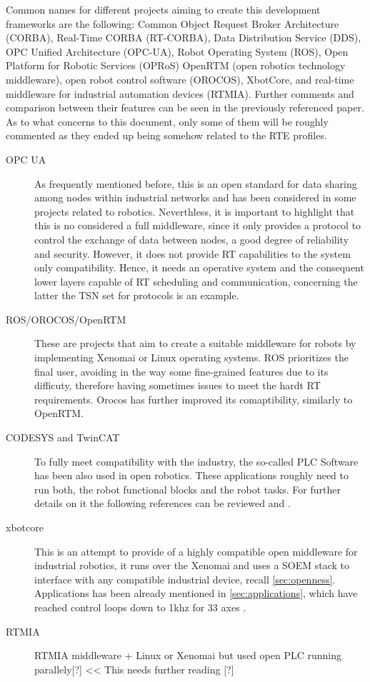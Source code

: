 Common names for different projects aiming to create this development frameworks are the following: Common Object Request Broker Architecture
(CORBA), Real-Time CORBA (RT-CORBA), Data Distribution Service (DDS), OPC Unified Architecture (OPC-UA), Robot Operating System
(ROS), Open Platform for Robotic Services (OPRoS) OpenRTM (open robotics technology middleware), open robot control software (OROCOS), 
XbotCore, and real-time middleware for industrial automation devices (RTMIA). Further comments and comparison between their features
can be seen in the previously referenced paper. As to what concerns to this document, only some of them will be roughly commented
as they ended up being somehow related to the RTE profiles\cite{middleware_xbotcore}.

\begin{description}
    \item[OPC UA] As frequently mentioned before, this is an open standard for data sharing among nodes within industrial networks and has
    been considered in some projects related to robotics. Neverthless, it is important to highlight that this is no considered a full 
    middleware, since it only provides a protocol to control the exchange of data between nodes, a good degree of reliability and security.
    However, it does not provide RT capabilities to the system only compatibility. Hence, it needs an operative system and the consequent 
    lower layers capable of RT scheduling and communication, concerning the latter the TSN set for protocols is an example.
    \item[ROS/OROCOS/OpenRTM] These are projects that aim to create a suitable middleware for robots by implementing Xenomai or Linux operating systems. 
    ROS prioritizes the final user, avoiding in the way some fine-grained features due to its difficuty, therefore having sometimes
    issues to meet the hardt RT requirements. Orocos has further improved its comaptibility, similarly to OpenRTM.
    \item[CODESYS and TwinCAT] To fully meet compatibility with the industry, the so-called PLC Software has been also used in open robotics.
    These applications roughly need to run both, the robot functional blocks and the robot tasks. For further details on it the following
    references can be reviewed \cite{middleware_xbotcore} and \cite{middleware_xbotcloud}. %
    \item[xbotcore] This is an attempt to provide of a highly compatible open middleware for industrial robotics, it runs over the Xenomai and 
    uses a SOEM stack to interface with any compatible industrial device, recall \ref{sec:openness}. %
    Applications has been already mentioned in \ref{sec:applications}, which have reached control loops down to 1khz for 33 axes \cite{middleware_xbotcore}.
    \item[RTMIA] RTMIA middleware + Linux or Xenomai but used open PLC running parallely[?] << This needs further reading [?]
\end{description}


